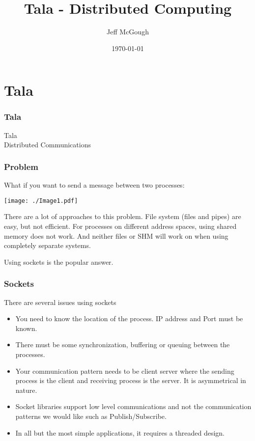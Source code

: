 \documentclass[xcolor=svgnames]{beamer}
\title{Tala - Distributed Computing}
\author{Jeff McGough}
\institute{Department of Computer Science and Engineering\\
  South Dakota School of Mines and Technology\\
  Rapid City, SD 57701, USA}
\date{\today}
\begin{document}
\begin{frame}[fragile]
\titlepage

\end{frame}




\section[Tala]{Tala}
\begin{frame}[fragile]
  \frametitle{Tala}
\begin{Large}
Tala \\[5mm]
Distributed Communications
\end{Large}
\end{frame}






\begin{frame}[fragile]
  \frametitle{Problem}

What if you want to send a message between two processes:
\begin{center}
\texttt{[image: ./Image1.pdf]}
\end{center}
There are a lot of approaches to this problem.  File system (files and pipes)
are easy, but not efficient. For processes on different
address spaces, using shared memory does not work.  And neither files or SHM will
work on when using completely separate systems.  

\vfill
Using sockets is the popular answer.

\end{frame}



\begin{frame}[fragile]
\frametitle{Sockets}
  
There are several issues using sockets
\begin{itemize}
\item You need to know the location of the process. IP address and Port
must be known.  
\item There must be some synchronization, buffering or queuing between the processes.
\item Your communication pattern needs to be client server where the 
sending process is the client and receiving process is the server. 
It is asymmetrical in nature.
\item Socket libraries support low level communications and not the communication 
patterns we would like such as Publish/Subscribe.
\item In all but the most simple applications, it requires a threaded design.
\end{itemize} 

\end{frame}
\end{document}
